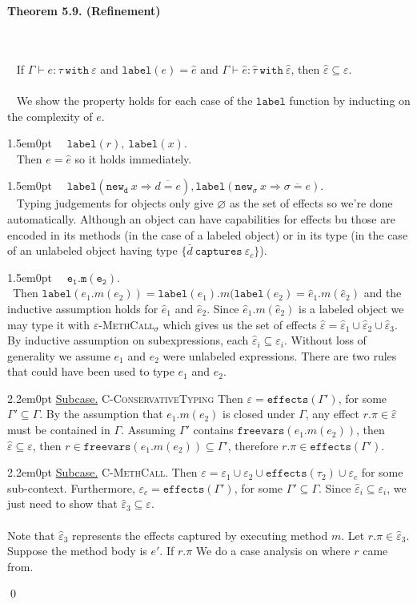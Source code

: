 \documentclass{llncs}
\newcommand{\keywadj}[1]{\mathtt{#1}}
\newcommand{\keyw}[1]{\keywadj{#1}~}
\newcommand{\thm}[3]{
	\begin{large}
		\bf{#1}
	\end{large} \\\\
	\fbox{Statement.} ~ #2
	\fbox{Proof.}~ #3 \qed
}
\newcommand{\proofcase}[2]{
	\begin{adjustwidth}{1.5em}{0pt}
		\fbox{Case.}~~#1. \\ ~#2
	\end{adjustwidth}
}
\newcommand{\subcase}[1] {
	\begin{adjustwidth}{2.2em}{0pt}
		\underline{Subcase.} #1
	\end{adjustwidth}
}
\begin{document}
\thm{Theorem 5.9. (Refinement)}
{If $\Gamma \vdash e : \tau~\keyw{with} \varepsilon$ and $\keywadj{label}(e) = \hat e$ and $\Gamma \vdash \hat e : \hat \tau~\keyw{with} \hat \varepsilon$, then $\hat \varepsilon \subseteq \varepsilon$.\\\\}
{We show the property holds for each case of the $\keywadj{label}$ function by inducting on the complexity of $e$.

\proofcase{$\keywadj{label}(r),~\keywadj{label}(x)$}{
	Then $e = \hat e$ so it holds immediately.
}
	
\proofcase{$\keywadj{label}(\keyw{new_d} x \Rightarrow \overline{d = e}), \keywadj{label}(\keyw{new_\sigma} x \Rightarrow \overline{\sigma = e})$}{
Typing judgements for objects only give $\varnothing$ as the set of effects so we're done automatically. Although an object can have capabilities for effects bu those are encoded in its methods (in the case of a labeled object) or in its type (in the case of an unlabeled object having type $\{ \bar d~\keyw{captures} \varepsilon_c\}$).
}	
	
\proofcase{$\keywadj{e_1.m(e_2)}$}{Then $\keywadj{label}(e_1.m(e_2)) = \keywadj{label}(e_1).m(\keywadj{label}(e_2) = \hat e_1 . m(\hat e_2)$ and the inductive assumption holds for $\hat e_1$ and $\hat e_2$. Since $\hat e_1 . m(\hat e_2)$ is a labeled object we may type it with \textsc{$\varepsilon$-MethCall$_\sigma$} which gives us the set of effects $\hat \varepsilon = \hat \varepsilon_1 \cup \hat \varepsilon_2 \cup \hat \varepsilon_3$. By inductive assumption on subexpressions, each $\hat \varepsilon_i \subseteq \varepsilon_i$. Without loss of generality we assume $e_1$ and $e_2$ were unlabeled expressions. There are two rules that could have been used to type $e_1$ and $e_2$.\\


	\subcase{\textsc{C-ConservativeTyping}
	Then $\varepsilon = \keywadj{effects}(\Gamma')$, for some $\Gamma' \subseteq \Gamma$. By the assumption that $e_1.m(e_2)$ is closed under $\Gamma$, any effect $r.\pi \in \hat \varepsilon$ must be contained in $\Gamma$. Assuming $\Gamma'$ contains $\keywadj{freevars}(e_1.m(e_2))$, then $\hat \varepsilon \subseteq \varepsilon$, then $r \in \keywadj{freevars}(e_1.m(e_2)) \subseteq \Gamma'$, therefore $r.\pi \in \keywadj{effects}(\Gamma')$.	}

	\subcase{\textsc{C-MethCall}. Then $\varepsilon = \varepsilon_1 \cup \varepsilon_2 \cup \keywadj{effects}(\tau_2) \cup \varepsilon_c$ for some sub-context. Furthermore, $\varepsilon_c = \keywadj{effects}(\Gamma')$, for some $\Gamma' \subseteq \Gamma$. Since $\hat \varepsilon_i \subseteq \varepsilon_i$, we just need to show that $\hat \varepsilon_3 \subseteq \varepsilon$. \\\\ Note that $\hat \varepsilon_3$ represents the effects captured by executing method $m$. Let $r.\pi \in \hat \varepsilon_3$. Suppose the method body is $e'$. If $r.\pi$ We do a case analysis on where $r$ came from. \\
	
}}}
\end{document}

